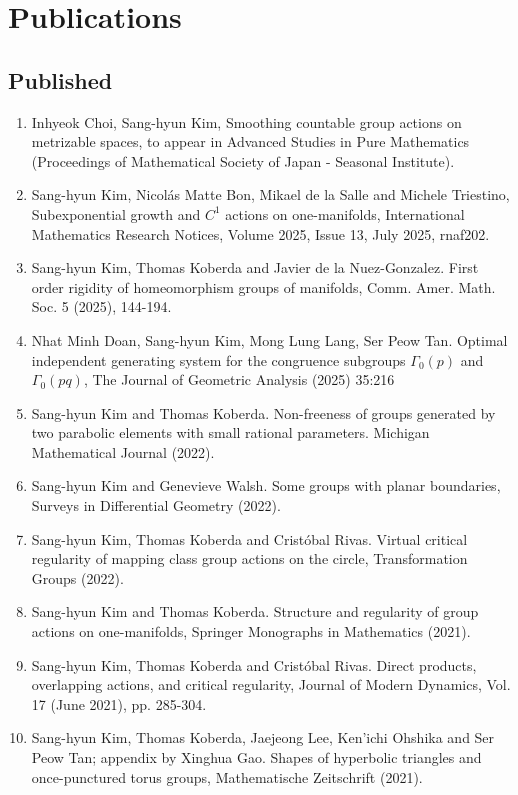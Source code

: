 \documentclass[11pt,a4paper]{article}
\begin{document}
\section*{Publications}
\subsection*{Published}
\begin{enumerate}[leftmargin=1.5em, label=\arabic*.]
\setcounter{enumi}{0}
\item Inhyeok Choi, Sang-hyun Kim, Smoothing countable group actions on metrizable spaces, to appear in Advanced Studies in Pure Mathematics (Proceedings of Mathematical Society of Japan - Seasonal Institute).
\item Sang-hyun Kim, Nicol\'as Matte Bon, Mikael de la Salle and Michele Triestino, Subexponential growth and $C^1$ actions on one-manifolds, International Mathematics Research Notices, Volume 2025, Issue 13, July 2025, rnaf202.
\item Sang-hyun Kim, Thomas Koberda and Javier de la Nuez-Gonzalez. First order rigidity of homeomorphism groups of manifolds, Comm. Amer. Math. Soc. 5 (2025), 144-194.
\item Nhat Minh Doan, Sang-hyun Kim, Mong Lung Lang, Ser Peow Tan. Optimal independent generating system for the congruence subgroups $\Gamma_0(p)$ and $\Gamma_0(pq)$, The Journal of Geometric Analysis (2025) 35:216
\item Sang-hyun Kim and Thomas Koberda. Non-freeness of groups generated by two parabolic elements with small rational parameters. Michigan Mathematical Journal (2022).
\item Sang-hyun Kim and Genevieve Walsh. Some groups with planar boundaries, Surveys in Differential Geometry (2022).
\item Sang-hyun Kim, Thomas Koberda and Crist\'obal Rivas. Virtual critical regularity of mapping class group actions on the circle, Transformation Groups (2022).
\item Sang-hyun Kim and Thomas Koberda. Structure and regularity of group actions on one-manifolds, Springer Monographs in Mathematics (2021).
\item Sang-hyun Kim, Thomas Koberda and Crist\'obal Rivas. Direct products, overlapping actions, and critical regularity, Journal of Modern Dynamics, Vol. 17 (June 2021), pp. 285-304.
\item Sang-hyun Kim, Thomas Koberda, Jaejeong Lee, Ken'ichi Ohshika and Ser Peow Tan; appendix by Xinghua Gao. Shapes of hyperbolic triangles and once-punctured torus groups, Mathematische Zeitschrift (2021).

\end{enumerate}
\end{document}
